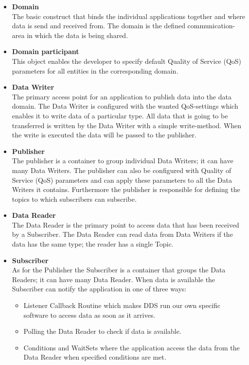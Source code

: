\documentclass[Main]{subfiles}
\begin{document}
\begin{itemize}
  \item \textbf{Domain}\\The basic construct that binds the individual applications together and where data is send and received from. The domain is the defined communication-area in which the data is being shared.
  \item \textbf{Domain participant}\\This object enables the developer to specify default Quality of Service (QoS) parameters for all entities in the corresponding domain.
  \item \textbf{Data Writer}\\The primary access point for an application to publish data into the data domain. The Data Writer is configured with the wanted QoS-settings which enables it to write data of a particular type. All data that is going to be transferred is written by the Data Writer with a simple write-method. When the write is executed the data will be passed to the publisher. 
  \item \textbf{Publisher}\\The publisher is a container to group individual Data Writers; it can have many Data Writers. The publisher can also be configured with Quality of Service (QoS) parameters and can apply these parameters to all the Data Writers it contains. Furthermore the publisher is responsible for defining the topics to which subscribers can subscribe.
  \item \textbf{Data Reader}\\The Data Reader is the primary point to access data that has been received by a Subscriber. The Data Reader can read data from Data Writers if the data has the same type; the reader has a single Topic.
  \item \textbf{Subscriber}\\As for the Publisher the Subscriber is a container that groups the Data Readers; it can have many Data Reader. When data is available the Subscriber can notify the application in one of three ways:
  \begin{itemize}
  \item Listener Callback Routine which makes DDS run our own specific software to access data as soon as it arrives.
  \item Polling the Data Reader to check if data is available.
  \item Conditions and WaitSets where the application access the data from the Data Reader when specified conditions are met.

\end{itemize}
\end{itemize}
\end{document}
